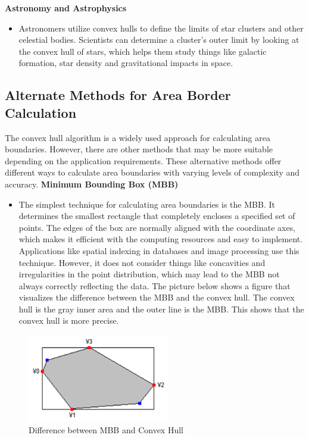     \textbf{Astronomy and Astrophysics}
    \begin{itemize}
        \item Astronomers utilize convex hulls to define the limits of star clusters and other celestial bodies. Scientists can determine a cluster's outer limit by looking at the convex hull of stars, which helps them study things like galactic formation, star density and gravitational impacts in space.
    \end{itemize}
    \autocite{Andi:irlApplication}

    \subsection{Alternate Methods for Area Border Calculation}
    The convex hull algorithm is a widely used approach for calculating area boundaries. However, there are other methods that may be more suitable depending on the application requirements. These alternative methods offer different ways to calculate area boundaries with varying levels of complexity and accuracy. \newline \newline
    \textbf{Minimum Bounding Box (MBB)}
    \begin{itemize}
        \item The simplest technique for calculating area boundaries is the MBB. It determines the smallest rectangle that completely encloses a specified set of points. The edges of the box are normally aligned with the coordinate axes, which makes it efficient with the computing resources and easy to implement. Applications like spatial indexing in databases and image processing use this technique. However, it does not consider things like concavities and irregularities in the point distribution, which may lead to the MBB not always correctly reflecting the data. The picture below shows a figure that visualizes the difference between the MBB and the convex hull. The convex hull is the gray inner area and the outer line is the MBB. This shows that the convex hull is more precise. \autocite{Andi:mbb}
    \end{itemize} 

    \begin{figure} [H]
        \centering
        \includegraphics [width=0.55\textwidth] {images/andreas/areaBorders/mbb.png}
        \caption{Difference between MBB and Convex Hull\autocite{Andi:mbbPic}}
        
    \end{figure}


